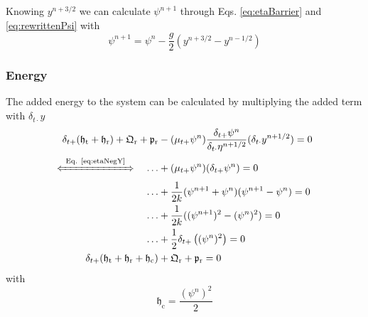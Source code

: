 \documentclass[dvipsnames]{article}
\def\mystrut{\rule[-.2\baselineskip]{0pt}{\baselineskip}}
\begin{document}
Knowing $y^{n+3/2}$ we can calculate $\psi^{n+1}$ through Eqs. \eqref{eq:etaBarrier} and \eqref{eq:rewrittenPsi} with
\begin{equation}\label{eq:psiUpdate}
    \psi^{n+1} = \psi^n - \frac{g}{2}\left(y^{n+3/2} - y^{n-1/2}\right)
\end{equation}
\subsubsection{Energy}
The added energy to the system can be calculated by multiplying the added term with $\delta_{t\cdot}y$
\begin{align}
    \delta_{t+}(\mathfrak{h}_\text{t}+\mathfrak{h}_\text{r}) + \mathfrak{Q}_\text{r} + \mathfrak{p}_\text{r}&-(\mu_{t+}\psi^n) \frac{\delta_{t+}\psi^n}{\delta_{t\cdot}\eta^{n+1/2}}(\delta_{t\cdot}y^{n+1/2}) = 0\nonumber\\[-5pt]
    \xLeftrightarrow{\mystrut\ \text{Eq. \eqref{eq:etaNegY}}\ }\quad \hdots &+ (\mu_{t+}\psi^n) (\delta_{t+}\psi^n) = 0\nonumber\\
    \hdots &+ \frac{1}{2k}(\psi^{n+1}+\psi^n)(\psi^{n+1} - \psi^n)=0\nonumber\\
    \hdots  &+\frac{1}{2k}((\psi^{n+1})^2 - (\psi^n)^2)=0\nonumber\\
    \hdots &+ \frac{1}{2}\delta_{t+}\left((\psi^n)^2\right) = 0\nonumber\\
    \delta_{t+}(\mathfrak{h}_\text{t}+\mathfrak{h}_\text{r} + \mathfrak{h}_\text{c}) &+ \mathfrak{Q}_\text{r} + \mathfrak{p}_\text{r} = 0
\end{align}
with
\begin{equation}
    \mathfrak{h}_\text{c} = \frac{(\psi^n)^2}{2 }\nonumber
\end{equation}
\end{document}
